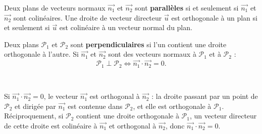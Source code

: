 \begin{propriete}
Deux plans de vecteurs normaux $\vec{n_1}$ et $\vec{n_2}$ sont \textbf{parallèles} si et seulement si $\vec{n_1}$ et $\vec{n_2}$ sont
colinéaires. Une droite de vecteur directeur $\vec u$ est orthogonale à un plan si et seulement si $\vec u$ est colinéaire à un
vecteur normal du plan.
\end{propriete}

\noindent
\begin{minipage}[c]{0.6\linewidth}
\begin{theoreme}
\raggedright
Deux plans $\mathcal{P}_1$ et $\mathcal{P}_2$ sont \textbf{perpendiculaires} si l'un contient une droite orthogonale à l'autre.
Si $\vec{n_1}$ et $\vec{n_2}$ sont des vecteurs normaux à $\mathcal{P}_1$ et à $\mathcal{P}_2$ :
\[\mathcal{P}_1\perp\mathcal{P}_2\iff\vec{n_1}\cdot\vec{n_2}=0.\]
\end{theoreme}
\end{minipage}\hfill
\begin{minipage}[c]{0.36\linewidth}
\centering
{}\\[0.5mm]
\end{minipage}

\begin{demonstration}
Si $\vec{n_1}\cdot\vec{n_2}=0$, le vecteur $\vec{n_1}$ est orthogonal à $\vec{n_2}$ : la droite passant par un point de
$\mathcal{P}_2$ et dirigée par $\vec{n_1}$ est contenue dans $\mathcal{P}_2$, et elle est orthogonale à $\mathcal{P}_1$.
Réciproquement, si $\mathcal{P}_2$ contient une droite orthogonale à $\mathcal{P}_1$, un vecteur directeur de cette droite est
colinéaire à $\vec{n_1}$ et orthogonal à $\vec{n_2}$, donc $\vec{n_1}\cdot\vec{n_2}=0$.
\end{demonstration}

